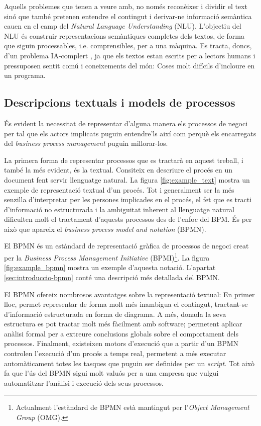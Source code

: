 Aquells problemes que tenen a veure amb, no només reconèixer i dividir el text sinó que també pretenen entendre el contingut i derivar-ne informació semàntica cauen en el camp del \emph{Natural Language Understanding} (NLU). L'objectiu del NLU és construir representacions semàntiques completes dels textos, de forma que siguin processables, i.e. comprensibles, per a una màquina. Es tracta, doncs, d'un problema IA-complert \cite[][secció 1]{ai_completeness}, ja que els textos estan escrits per a lectors humans i pressuposen sentit comú i coneixements del món: Coses molt difícils d'incloure en un programa.


\subsection{Descripcions textuals i models de processos}
\label{sec:introduccio-bpm-descripcio}
És evident la necessitat de representar d'alguna manera els processos de negoci per tal que els actors implicats puguin entendre'ls així com perquè els encarregats del \emph{business process management} puguin millorar-los.

La primera forma de representar processos que es tractarà en aquest treball, i també la més evident, és la textual. Consiteix en descriure el procés en un document fent servir llenguatge natural. La figura \ref{fig:example_text} mostra un exemple de representació textual d'un procés. Tot i generalment ser la més senzilla d'interpretar \cite{text_with_bpmn} per les persones implicades en el procés, el fet que es tracti d'informació no estructurada i la ambiguitat inherent al llenguatge natural dificulten molt el tractament d'aquests processos des de l'enfoc del BPM. És per això que apareix el \emph{business process model and notation} (BPMN). 

El BPMN és un estàndard de representació gràfica de processos de negoci creat per la \emph{Business Process Management Initiative} (BPMI)\footnote{Actualment l'estàndard de BPMN està mantingut per l'\emph{Object Management Group} (OMG).}. La figura \ref{fig:example_bpmn} mostra un exemple d'aquesta notació. L'apartat \ref{sec:introduccio-bpmn} conté una descripció més detallada del BPMN.

El BPMN ofereix nombrosos avantatges sobre la representació textual: En primer lloc, permet representar de forma molt més inambigua el contingut, tractant-se d'informació estructurada en forma de diagrama. A més, donada la seva estructura es pot tractar molt més fàcilment amb software; permetent aplicar anàlisi formal per a extreure conclusions globals sobre el comportament dels processos. Finalment, existeixen motors d'execució que a partir d'un BPMN controlen l'execució d'un procés a temps real, permetent a més executar automàticament totes les tasques que puguin ser definides per un \emph{script}. Tot això fa que l'ús del BPMN sigui molt valuós per a una empresa que vulgui automatitzar l'anàlisi i execució dels seus processos.

